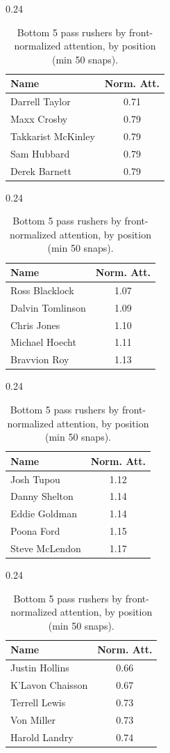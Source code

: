 \begin{table}[h!]
\centering
\begin{subtable}{0.24\textwidth}
\centering
\footnotesize
\begin{tabular}{lc}
\toprule
Name & Norm. Att. \\
\midrule
Darrell Taylor & 0.71 \\
Maxx Crosby & 0.79 \\
Takkarist McKinley & 0.79 \\
Sam Hubbard & 0.79 \\
Derek Barnett & 0.79 \\
\bottomrule
\end{tabular}
\caption{DE}
\end{subtable}
\hfill
\begin{subtable}{0.24\textwidth}
\centering
\footnotesize
\begin{tabular}{lc}
\toprule
Name & Norm. Att. \\
\midrule
Ross Blacklock & 1.07 \\
Dalvin Tomlinson & 1.09 \\
Chris Jones & 1.10 \\
Michael Hoecht & 1.11 \\
Bravvion Roy & 1.13 \\
\bottomrule
\end{tabular}
\caption{DT}
\end{subtable}
\hfill
\begin{subtable}{0.24\textwidth}
\centering
\footnotesize
\begin{tabular}{lc}
\toprule
Name & Norm. Att. \\
\midrule
Josh Tupou & 1.12 \\
Danny Shelton & 1.14 \\
Eddie Goldman & 1.14 \\
Poona Ford & 1.15 \\
Steve McLendon & 1.17 \\
\bottomrule
\end{tabular}
\caption{NT}
\end{subtable}
\hfill
\begin{subtable}{0.24\textwidth}
\centering
\footnotesize
\begin{tabular}{lc}
\toprule
Name & Norm. Att. \\
\midrule
Justin Hollins & 0.66 \\
K'Lavon Chaisson & 0.67 \\
Terrell Lewis & 0.73 \\
Von Miller & 0.73 \\
Harold Landry & 0.74 \\
\bottomrule
\end{tabular}
\caption{OLB}
\end{subtable}
\caption{Bottom 5 pass rushers by front-normalized attention, by position (min 50 snaps).}
\label{tab:att_bot_norm}
\end{table}
